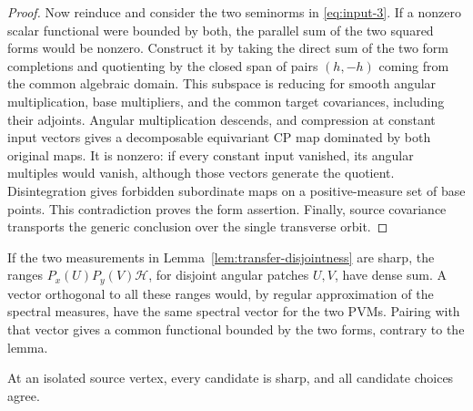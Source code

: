 \begin{proof}
Now reinduce and consider the two seminorms in
\eqref{eq:input-3}. If a nonzero scalar functional were bounded by both,
the parallel sum of the two squared forms would be nonzero. Construct
it by taking the direct sum of the two form completions and quotienting
by the closed span of pairs $(h,-h)$ coming from the common algebraic
domain. This subspace is reducing for smooth angular multiplication,
base multipliers, and the common target covariances, including their
adjoints. Angular multiplication descends, and compression at constant
input vectors gives a decomposable equivariant CP map dominated by
both original maps. It is nonzero: if every constant input vanished,
its angular multiples would vanish, although those vectors generate
the quotient. Disintegration gives forbidden subordinate maps on a
positive-measure set of base points. This contradiction proves the
form assertion. Finally, source covariance transports the generic
conclusion over the single transverse orbit.
\end{proof}

\begin{remark}
\label{rem:transfer-disjoint-ranges}
If the two measurements in Lemma~\ref{lem:transfer-disjointness} are
sharp, the ranges $P_x(U)P_y(V)\mathcal H$, for disjoint angular
patches $U,V$, have dense sum. A vector orthogonal to all these ranges
would, by regular approximation of the spectral measures, have the
same spectral vector for the two PVMs. Pairing with that vector gives
a common functional bounded by the two forms, contrary to the lemma.
\end{remark}

\begin{proposition}
\label{prop:transfer-isolated-sharpness}
At an isolated source vertex, every candidate is sharp, and all
candidate choices agree.
\end{proposition}

